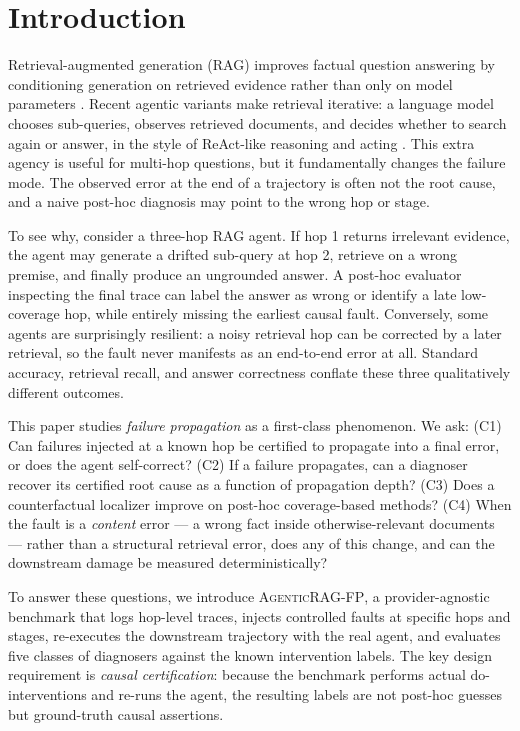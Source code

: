 \documentclass[11pt]{article}
\newcommand{\ours}{\textnormal{\textsc{AgenticRAG-FP}}}
\begin{document}
\section{Introduction}

Retrieval-augmented generation (RAG) improves factual question answering by
conditioning generation on retrieved evidence rather than only on model
parameters \citep{lewis2020rag}.  Recent agentic variants make retrieval
iterative: a language model chooses sub-queries, observes retrieved documents,
and decides whether to search again or answer, in the style of ReAct-like
reasoning and acting \citep{yao2022react}.  This extra agency is useful for
multi-hop questions, but it fundamentally changes the failure mode.  The
observed error at the end of a trajectory is often not the root cause, and a
naive post-hoc diagnosis may point to the wrong hop or stage.

To see why, consider a three-hop RAG agent.  If hop 1 returns irrelevant
evidence, the agent may generate a drifted sub-query at hop 2, retrieve on a
wrong premise, and finally produce an ungrounded answer.  A post-hoc evaluator
inspecting the final trace can label the answer as wrong or identify a
late low-coverage hop, while entirely missing the earliest causal fault.
Conversely, some agents are surprisingly resilient: a noisy retrieval hop can be
corrected by a later retrieval, so the fault never manifests as an end-to-end
error at all.  Standard accuracy, retrieval recall, and answer correctness
conflate these three qualitatively different outcomes.

This paper studies \emph{failure propagation} as a first-class phenomenon.  We
ask: (C1) Can failures injected at a known hop be certified to propagate into a
final error, or does the agent self-correct?  (C2) If a failure propagates, can
a diagnoser recover its certified root cause as a function of propagation depth?
(C3) Does a counterfactual localizer improve on post-hoc coverage-based
methods?  (C4) When the fault is a \emph{content} error --- a wrong fact inside
otherwise-relevant documents --- rather than a structural retrieval error, does
any of this change, and can the downstream damage be measured deterministically?

To answer these questions, we introduce \ours, a provider-agnostic benchmark
that logs hop-level traces, injects controlled faults at specific hops and
stages, re-executes the downstream trajectory with the real agent, and evaluates
five classes of diagnosers against the known intervention labels.  The key
design requirement is \emph{causal certification}: because the benchmark
performs actual do-interventions and re-runs the agent, the resulting labels are
not post-hoc guesses but ground-truth causal assertions.
\end{document}

